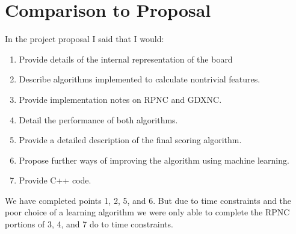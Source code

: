 \documentclass[11pt,letterpaper]{article}
\begin{document}
\section{Comparison to Proposal}

In the project proposal I said that I would:
\begin{enumerate}
  \item Provide details of the internal representation of the board
  \item Describe algorithms implemented to calculate nontrivial features.
  \item Provide implementation notes on RPNC and GDXNC.
  \item Detail the performance of both algorithms.
  \item Provide a detailed description of the final scoring algorithm.
  \item Propose further ways of improving the algorithm using machine learning.
  \item Provide C++ code.
\end{enumerate}

We have completed points 1, 2, 5, and 6. But due to time constraints and the poor choice of a learning algorithm
we were only able to complete the RPNC portions of 3, 4, and 7 do to time constraints.
\end{document}
